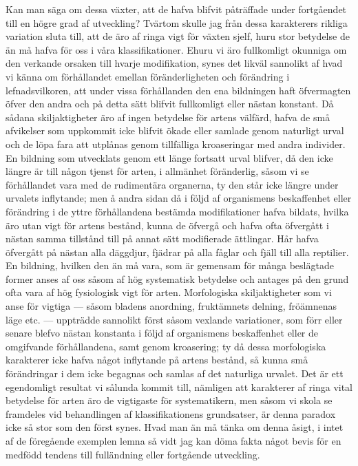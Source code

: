 Kan man säga om dessa växter, att de hafva blifvit påträffade under fortgåendet till en högre grad af utveckling? Tvärtom skulle jag från dessa karakterers rikliga variation sluta till, att de äro af ringa vigt för växten sjelf, huru stor betydelse de än må hafva för oss i våra klassifikationer. Ehuru vi äro fullkomligt okunniga om den verkande orsaken till hvarje modifikation, synes det likväl sannolikt af hvad vi känna om förhållandet emellan föränderligheten och förändring i lefnadsvilkoren, att under vissa förhållanden den ena bildningen haft öfvermagten öfver den andra och på detta sätt blifvit fullkomligt eller nästan konstant. Då sådana skiljaktigheter äro af ingen betydelse för artens välfärd, hafva de små afvikelser som uppkommit icke blifvit ökade eller samlade genom naturligt urval och de löpa fara att utplånas genom tillfälliga kroaseringar med andra individer. En bildning som utvecklats genom ett länge fortsatt urval blifver, då den icke längre är till någon tjenst för arten, i allmänhet föränderlig, såsom vi se förhållandet vara med de rudimentära organerna, ty den står icke längre under urvalets inflytande; men å andra sidan då i följd af organismens beskaffenhet eller förändring i de yttre förhållandena bestämda modifikationer hafva bildats, hvilka äro utan vigt för artens bestånd, kunna de öfvergå och hafva ofta öfvergått i nästan samma tillstånd till på annat sätt modifierade ättlingar. Hår hafva öfvergått på nästan alla däggdjur, fjädrar på alla fåglar och fjäll till alla reptilier. En bildning, hvilken den än må vara, som är gemensam för många beslägtade former anses af oss såsom af hög systematisk betydelse och antages på den grund ofta vara af hög fysiologisk vigt för arten. Morfologiska skiljaktigheter som vi anse för vigtiga — såsom bladens anordning, fruktämnets delning, fröämnenas läge etc. — uppträdde sannolikt först såsom vexlande variationer, som förr eller senare blefvo nästan konstanta i följd af organismens beskaffenhet eller de omgifvande förhållandena, samt genom kroasering; ty då dessa morfologiska karakterer icke hafva något inflytande på artens bestånd, så kunna små förändringar i dem icke begagnas och samlas af det naturliga urvalet. Det är ett egendomligt resultat vi sålunda kommit till, nämligen att karakterer af ringa vital betydelse för arten äro de vigtigaste för systematikern, men såsom vi skola se framdeles vid behandlingen af klassifikationens grundsatser, är denna paradox icke så stor som den först synes. Hvad man än må tänka om denna åsigt, i intet af de föregående exemplen lemna så vidt jag kan döma fakta något bevis för en medfödd tendens till fulländning eller fortgående utveckling.

